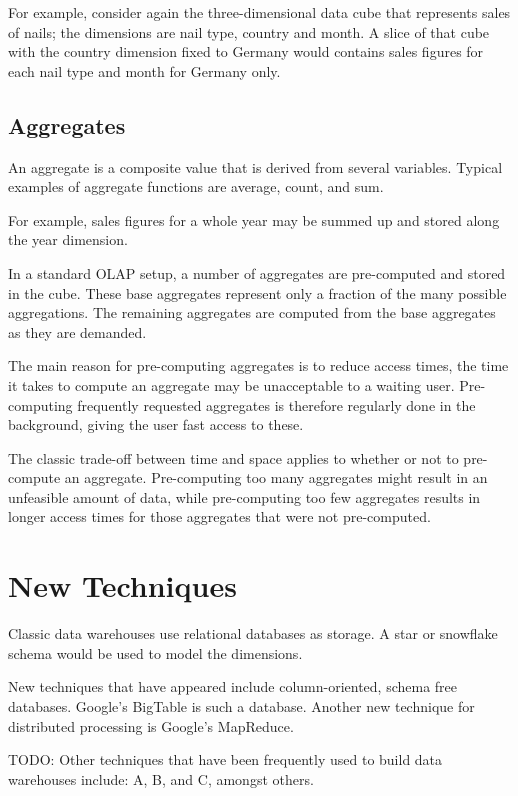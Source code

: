 For example, consider again the three-dimensional data cube that represents
sales of nails; the dimensions are nail type, country and month. A slice of
that cube with the country dimension fixed to Germany would contains sales
figures for each nail type and month for Germany only.


\subsection*{Aggregates}

An aggregate is a composite value that is derived from several variables.
Typical examples of aggregate functions are average, count, and sum.

For example, sales figures for a whole year may be summed up and stored along
the year dimension.

In a standard OLAP setup, a number of aggregates are pre-computed and
stored in the cube. These base aggregates represent only a fraction of the
many possible aggregations. The remaining aggregates are computed from the
base aggregates as they are demanded.

The main reason for pre-computing aggregates is to reduce access times, the
time it takes to compute an aggregate may be unacceptable to a waiting
user. Pre-computing frequently requested aggregates is therefore regularly
done in the background, giving the user fast access to these.
\cite{olap_solutions}

The classic trade-off between time and space applies to whether or not to
pre-compute an aggregate. Pre-computing too many aggregates might result in an
unfeasible amount of data, while pre-computing too few aggregates results in
longer access times for those aggregates that were not pre-computed.


\section{New Techniques}

Classic data warehouses use relational databases as storage. A star or snowflake
schema would be used to model the dimensions.

New techniques that have appeared include column-oriented, schema free
databases. Google's BigTable is such a database. Another new technique for
distributed processing is Google's MapReduce.

TODO:
Other techniques that have been frequently used to build data warehouses
include: A, B, and C, amongst others.

